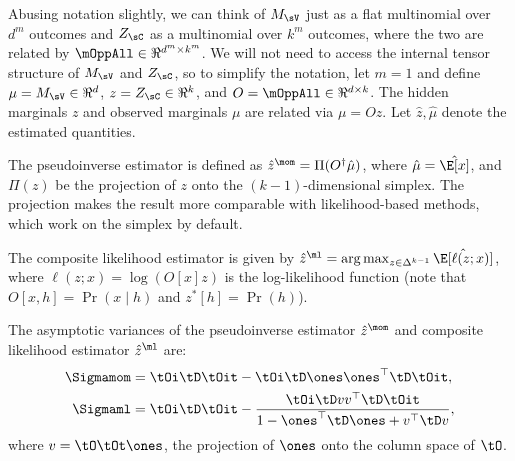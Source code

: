 Abusing notation slightly, we can think of $M_\sV$ just as a flat multinomial over $d^m$ outcomes
and $Z_\sC$ as a multinomial over $k^m$ outcomes, where the two are related by
$\mOppAll \in \Re^{d^m \times k^m}$.
We will not need to access the internal tensor structure of $M_\sV$ and $Z_\sC$,
so to simplify the notation, let $m=1$
and define $\mu = M_\sV \in \Re^d$,
$z = Z_\sC \in \Re^k$,
and $O = \mOppAll \in \Re^{d \times k}$.
The hidden marginals $z$ and observed marginals $\mu$ are related via $\mu = O z$.
Let $\hat z,\hat\mu$ denote the estimated quantities.

The pseudoinverse estimator is defined as $\hat z^\mom = \Pi(O^\dagger \hat\mu)$,
where $\hat\mu = \hat\E[x]$, and $\Pi(z)$ be the projection of $z$ onto the
$(k-1)$-dimensional simplex.  The projection makes the result more comparable with likelihood-based methods,
which work on the simplex by default.

The composite likelihood estimator is given by $\hat z^\ml = \arg\max_{z \in \Delta^{k-1}} \hat\E[\ell(z; x)]$,
where $\ell(z; x) = \log(O[x] z)$ is the log-likelihood function
(note that $O[x, h] = \Pr(x \mid h)$ and $z^*[h] = \Pr(h)$).

\begin{lemma}
  \label{lem:mom-pw-variance}
  The asymptotic variances of the pseudoinverse estimator $\hat z^\mom$
  and composite likelihood estimator $\hat z^\ml$ are:
  \begin{align*}
    \Sigmamom 
      &= \tOi \tD \tOit - \tOi \tD \ones \ones^\top \tD \tOit, \\
    \Sigmaml 
      &=\tOi \tD \tOit 
        - \frac{\tOi \tD v v^\top \tD \tOit }
        {1 - \ones^\top \tD \ones + v^\top \tD v },
  \end{align*}
  where $v = \tO \tOt \ones$, the projection of $\ones$ onto the column
  space of $\tO$.
\end{lemma}

